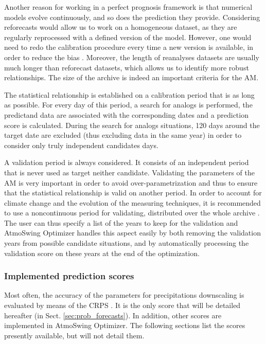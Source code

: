 \documentclass[review]{elsarticle}
\begin{document}
Another reason for working in a perfect prognosis framework is that numerical models evolve continuously, and so does the prediction they provide. Considering reforecasts would allow us to work on a homogeneous dataset, as they are regularly reprocessed with a defined version of the model. However, one would need to redo the calibration procedure every time a new version is available, in order to reduce the bias \citep{Wilson2002}. Moreover, the length of reanalyses datasets are usually much longer than reforecast datasets, which allows us to identify more robust relationships. The size of the archive is indeed an important criteria for the AM.

The statistical relationship is established on a calibration period that is as long as possible. For every day of this period, a search for analogs is performed, the predictand data are associated with the corresponding dates and a prediction score is calculated. During the search for analogs situations, 120 days around the target date are excluded (thus excluding data in the same year) in order to consider only truly independent candidates days.

A validation period is always considered. It consists of an independent period that is never used as target neither candidate. Validating the parameters of the AM is very important in order to avoid over-parametrization and thus to ensure that the statistical relationship is valid on another period. In order to account for climate change and the evolution of the measuring techniques, it is recommended to use a noncontinuous period for validating, distributed over the whole archive \citep{BenDaoud2010}. The user can thus specify a list of the years to keep for the validation and AtmoSwing Optimizer handles this aspect easily by both removing the validation years from possible candidate situations, and by automatically processing the validation score on these years at the end of the optimization.


\subsubsection{Implemented prediction scores}
\label{sec:forecasts-scores}

Most often, the accuracy of the parameters for precipitations downscaling is evaluated by means of the CRPS \citep[Continuous Ranked Probability Score,][]{Brown1974, Matheson1976, Hersbach2000}. It is the only score that will be detailed hereafter (in Sect. \ref{sec:prob_forecasts}). In addition, other scores are implemented in AtmoSwing Optimizer. The following sections list the scores presently available, but will not detail them.
\end{document}
